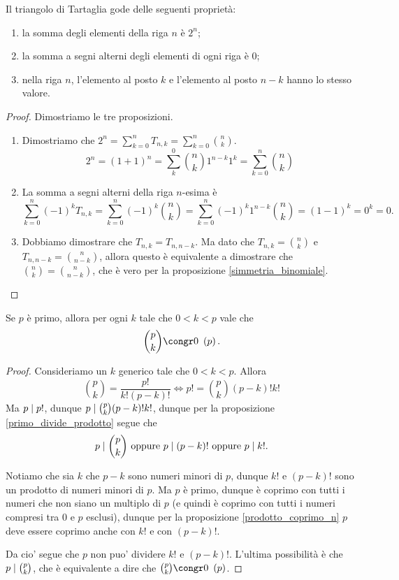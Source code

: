 \begin{proposition}
    Il triangolo di Tartaglia gode delle seguenti proprietà:
    \begin{enumerate}
        \item la somma degli elementi della riga $n$ è $2^n$;
        \item la somma a segni alterni degli elementi di ogni riga è $0$;
        \item nella riga $n$, l'elemento al posto $k$ e l'elemento al posto $n-k$ hanno lo stesso valore.
    \end{enumerate}
\end{proposition}
\begin{proof}
    Dimostriamo le tre proposizioni.
    \begin{enumerate}
        \item Dimostriamo che $2^n = \sum_{k=0}^n T_{n, k} = \sum_{k=0}^n \binom{n}{k}$.
        \[2^n = (1+1)^n = \sum_k^0 \binom{n}{k}1^{n-k}1^k = \sum_{k=0}^n \binom{n}{k}\]
        \item La somma a segni alterni della riga $n$-esima è \[\sum_{k=0}^n (-1)^kT_{n, k} = \sum_{k=0}^n (-1)^k\binom{n}{k} = \sum_{k=0}^n (-1)^k1^{n-k}\binom{n}{k} = (1-1)^k = 0^k = 0.\]
        \item Dobbiamo dimostrare che $T_{n, k} = T_{n, n-k}$. Ma dato che $T_{n, k} = \binom{n}{k}$ e $T_{n, n-k} = \binom{n}{n-k}$, allora questo è equivalente a dimostrare che $\binom{n}{k} = \binom{n}{n-k}$, che è vero per la proposizione \ref{simmetria_binomiale}. \qedhere
    \end{enumerate}
\end{proof}

\begin{proposition}\label{binomio_pk_divisibile_p}
    Se $p$ è primo, allora per ogni $k$ tale che $0 < k < p$ vale che
    \begin{equation}
        \binom{p}{k} \congr 0 \Mod{p}.
    \end{equation}
\end{proposition}
\begin{proof}
    Consideriamo un $k$ generico tale che $0 < k < p$.
    Allora \[
        \binom{p}{k} = \frac{p!}{k!(p-k)!} \iff p! = \binom{p}{k}(p-k)!k!    
    \]
    Ma $p \mid p!$, dunque $p \mid \binom{p}{k}(p-k)!k!$, dunque per la proposizione \ref{primo_divide_prodotto} segue che \[
        p \mid \binom{p}{k} \text{ oppure } p \mid (p-k)! \text{ oppure } p \mid k!
    .\]

    Notiamo che sia $k$ che $p-k$ sono numeri minori di $p$, dunque $k!$ e $(p-k)!$ sono un prodotto di numeri minori di $p$. Ma $p$ è primo, dunque è coprimo con tutti i numeri che non siano un multiplo di $p$ (e quindi è coprimo con tutti i numeri compresi tra $0$ e $p$ esclusi), dunque per la proposizione \ref{prodotto_coprimo_n} $p$ deve essere coprimo anche con $k!$ e con $(p-k)!$. 
    
    Da cio' segue che $p$ non puo' dividere $k!$ e $(p-k)!$.
    L'ultima possibilità è che $p \mid \binom{p}{k}$, che è equivalente a dire che $\binom{p}{k} \congr 0 \Mod{p}$.
\end{proof}

